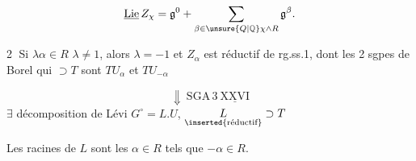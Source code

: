 \[
\underline{\mathrm{Lie}}\, Z_\chi=\mathfrak g^{0}+
 \sum_{\beta\in\unsure{Q|\mathbb Q}\chi\mathbin{\wedge}R}\mathfrak g^\beta .
\]

\textcircled{2} Si $\lambda\alpha\in R$ \quad $\lambda\neq1$, alors $\lambda=-1$ et $Z_\alpha$ est réductif de rg.ss.1, dont les 2 sgpes de Borel qui $\supset T$ sont $TU_\alpha$ et $TU_{-\alpha}$

\[
\Downarrow\ \mathrm{SGA}\,3\ \underline{\mathrm{XXVI}}
\]
$\exists$ décomposition de Lévi \qquad $G^\circ=L.U$, \quad $\underset{\text{\inserted{réductif}}}{L}\supset T$

Les racines de $L$ sont les $\alpha\in R$ tels que $-\alpha\in R$.

